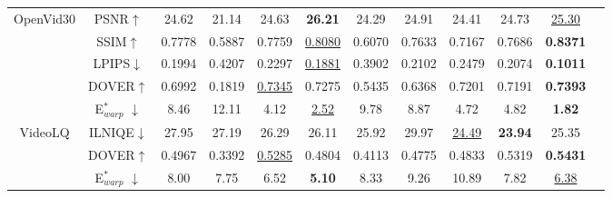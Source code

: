 \begin{table}[t!]
{\begin{tabular}{cc|cccc|cccccc}
    \multirow{5}{*}{OpenVid30} & PSNR$\uparrow$ & 24.62 & 21.14 & 24.63 & \textbf{26.21} & 24.29 & 24.91 & 24.41 & 24.73 & \underline{25.30} \\
    ~ & SSIM$\uparrow$ & 0.7778 & 0.5887 & 0.7759 & \underline{0.8080} & 0.6070 & 0.7633 & 0.7167 & 0.7686 & \textbf{0.8371} \\
    ~ & LPIPS$\downarrow$ & 0.1994 & 0.4207 & 0.2297 & \underline{0.1881} & 0.3902 & 0.2102 & 0.2479 & 0.2074 & \textbf{0.1011} \\
    ~ & DOVER$\uparrow$ & 0.6992 & 0.1819 & \underline{0.7345} & 0.7275 & 0.5435 & 0.6368 & 0.7201 & 0.7191 & \textbf{0.7393} \\
    ~ & E$^*_{warp}$ $\downarrow$ & 8.46 & 12.11 & 4.12 & \underline{2.52} & 9.78 & 8.87 & 4.72 & 4.82 & \textbf{1.82} \\ \hline \hline
    \multirow{4}{*}{VideoLQ} & ILNIQE$\downarrow$ & 27.95 & 27.19 & 26.29 & 26.11 & 25.92 & 29.97 & \underline{24.49} & \textbf{23.94} & 25.35 \\
    ~ & DOVER$\uparrow$ & 0.4967 & 0.3392 & \underline{0.5285} & 0.4804 & 0.4113 & 0.4775 & 0.4833 & 0.5319 & \textbf{0.5431} \\
    ~ & E$^*_{warp}$ $\downarrow$ & 8.00 & 7.75 & 6.52 & \textbf{5.10} & 8.33 & 9.26 & 10.89 & 7.82 & \underline{6.38} \\ \hline
    \end{tabular}}
\end{table}




